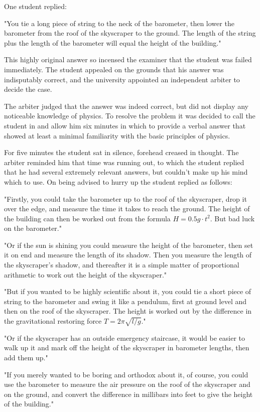 One student replied: 

"You tie a long piece of string to the neck of the barometer, then lower the barometer from the roof of the skyscraper to the ground. The length of the string plus the length of the barometer will equal the height of the building." 

This highly original answer so incensed the examiner that the student was failed immediately. The student appealed on the grounds that his answer was indisputably correct, and the university appointed an independent arbiter to decide the case. 

The arbiter judged that the answer was indeed correct, but did not display any noticeable knowledge of physics. To resolve the problem it was decided to call the student in and allow him six minutes in which to provide a verbal answer that showed at least a minimal familiarity with the basic principles of physics. 

For five minutes the student sat in silence, forehead creased in thought. The arbiter reminded him that time was running out, to which the student replied that he had several extremely relevant answers, but couldn't make up his mind which to use. On being advised to hurry up the student replied as follows: 

"Firstly, you could take the barometer up to the roof of the skyscraper, drop it over the edge, and measure the time it takes to reach the ground. The height of the building can then be worked out from the formula $H = 0.5g\cdot t^2$. But bad luck on the barometer." 

"Or if the sun is shining you could measure the height of the barometer, then set it on end and measure the length of its shadow. Then you measure the length of the skyscraper's shadow, and thereafter it is a simple matter of proportional arithmetic to work out the height of the skyscraper." 

"But if you wanted to be highly scientific about it, you could tie a short piece of string to the barometer and swing it like a pendulum, first at ground level and then on the roof of the skyscraper. The height is worked out by the difference in the gravitational restoring force $T =2 \pi \sqrt{l /g}$." 

"Or if the skyscraper has an outside emergency staircase, it would be easier to walk up it and mark off the height of the skyscraper in barometer lengths, then add them up." 

"If you merely wanted to be boring and orthodox about it, of course, you could use the barometer to measure the air pressure on the roof of the skyscraper and on the ground, and convert the difference in millibars into feet to give the height of the building." 


